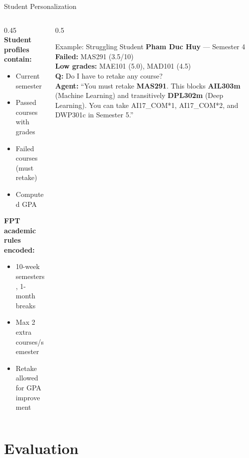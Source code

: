 \documentclass[aspectratio=169,10pt]{beamer}
\begin{document}
\begin{frame}{Student Personalization}

\begin{columns}[T]
\begin{column}{0.45\textwidth}
\textbf{Student profiles contain:}
\begin{itemize}
    \item Current semester
    \item Passed courses with grades
    \item Failed courses (must retake)
    \item Computed GPA
\end{itemize}

\vspace{0.5em}
\textbf{FPT academic rules encoded:}
\begin{itemize}
    \item 10-week semesters, 1-month breaks
    \item Max 2 extra courses/semester
    \item Retake allowed for GPA improvement
\end{itemize}
\end{column}

\begin{column}{0.5\textwidth}
\begin{exampleblock}{Example: Struggling Student}
\footnotesize
\textbf{Pham Duc Huy} --- Semester 4\\
\textbf{Failed:} MAS291 (3.5/10)\\
\textbf{Low grades:} MAE101 (5.0), MAD101 (4.5)\\[0.5em]
\textbf{Q:} Do I have to retake any course?\\[0.3em]
\textbf{Agent:} ``You must retake \textbf{MAS291}. This blocks \textbf{AIL303m} (Machine Learning) and transitively \textbf{DPL302m} (Deep Learning). You can take AI17\_COM*1, AI17\_COM*2, and DWP301c in Semester 5.''
\end{exampleblock}
\end{column}
\end{columns}

\end{frame}


\section{Evaluation}
\end{document}
